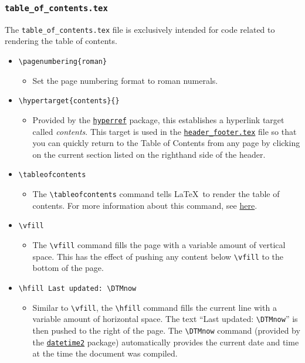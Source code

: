 \subsubsection{\texttt{table\_of\_contents.tex}}
\label{sec:table_of_contents.tex}


The \texttt{table\_of\_contents.tex} file is exclusively intended for code related to rendering the table of contents.
\begin{itemize}
    \item \lstinline|\pagenumbering{roman}|
    \begin{itemize}
        \item Set the page numbering format to roman numerals.
    \end{itemize}
    \item \lstinline|\hypertarget{contents}{}|
    \begin{itemize}
        \item Provided by the \href{https://ctan.org/pkg/hyperref}{\texttt{hyperref}} package, this establishes a hyperlink target called \textit{contents}. This target is used in the \hyperref[sec:header_footer.tex]{\texttt{header\_footer.tex}} file so that you can quickly return to the Table of Contents from any page by clicking on the current section listed on the righthand side of the header. 
    \end{itemize}
    \item \lstinline|\tableofcontents|
    \begin{itemize}
        \item The \lstinline|\tableofcontents| command tells \LaTeX\ to render the table of contents. For more information about this command, see \href{https://en.wikibooks.org/wiki/LaTeX/Document_Structure#Table_of_contents}{here}.
    \end{itemize}
    \item \lstinline|\vfill|
    \begin{itemize}
        \item The \lstinline|\vfill| command fills the page with a variable amount of vertical space. This has the effect of pushing any content below \lstinline|\vfill| to the bottom of the page.
    \end{itemize}
    \item \lstinline|\hfill Last updated: \DTMnow|
    \begin{itemize}
        \item Similar to \lstinline|\vfill|, the \lstinline|\hfill| command fills the current line with a variable amount of horizontal space. The text ``Last updated: \lstinline|\DTMnow|'' is then pushed to the right of the page. The \lstinline|\DTMnow| command (provided by the \href{https://ctan.org/pkg/datetime2}{\texttt{datetime2}} package) automatically provides the current date and time at the time the document was compiled.

\end{itemize}
\end{itemize}
